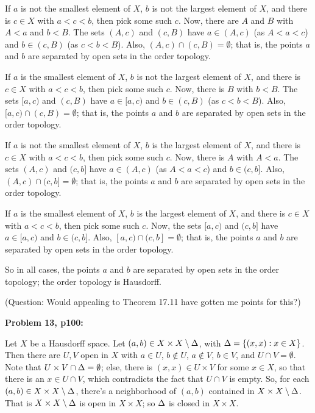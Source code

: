 \documentclass[a4paper,12pt]{article}
\begin{document}
If $a$ is not the smallest element of $X$, $b$ is not the largest element of $X$, and there is $c \in X$ with $a < c < b$, then pick some such $c$. Now, there are $A$ and $B$ with $A< a$ and $b < B$. The sets $(A,c)$ and $(c,B)$ have $a \in (A,c)$ (as $A < a < c$) and $b \in (c,B)$ (as $c<b<B$). Also, $(A,c) \cap (c,B) = \emptyset$; that is, the points $a$ and $b$ are separated by open sets in the order topology. %

If $a$ is the smallest element of $X$, $b$ is not the largest element of $X$, and there is $c \in X$ with $a < c < b$, then pick some such $c$. Now, there is $B$ with $b < B$. The sets $[a,c)$ and $(c,B)$ have $a \in [a,c)$ and $b \in (c,B)$ (as $c<b<B$). Also, $[a,c) \cap (c,B) = \emptyset$; that is, the points $a$ and $b$ are separated by open sets in the order topology. %

If $a$ is not the smallest element of $X$, $b$ is the largest element of $X$, and there is $c \in X$ with $a < c < b$, then pick some such $c$. Now, there is $A$ with $A< a$. The sets $(A,c)$ and $(c,b]$ have $a \in (A,c)$ (as $A < a < c$) and $b \in (c,b]$. Also, $(A,c) \cap (c,b] = \emptyset$; that is, the points $a$ and $b$ are separated by open sets in the order topology. %

If $a$ is the smallest element of $X$, $b$ is the largest element of $X$, and there is $c \in X$ with $a < c < b$, then pick some such $c$. Now, the sets $[a,c)$ and $(c,b]$ have $a \in [a,c)$ and $b \in (c,b]$. Also, $[a,c) \cap (c,b] = \emptyset$; that is, the points $a$ and $b$ are separated by open sets in the order topology. %

So in all cases, the points $a$ and $b$ are separated by open sets in the order topology; the order topology is Hausdorff.

(Question: Would appealing to Theorem 17.11 have gotten me points for this?)

\shunt

{\bf Problem 13, p100:}

Let $X$ be a Hausdorff space. Let $(a,b) \in X \times X \setminus \Delta$, with $\Delta = \{(x,x): x \in X\}$. Then there are $U,V$ open in $X$ with $a \in U$, $b \notin U$, $a \notin V$, $b \in V$, and $U \cap V = \emptyset$. Note that $U \times V \cap \Delta = \emptyset$; else, there is $(x,x) \in U \times V$ for some $x \in X$, so that there is an $x \in U \cap V$, which contradicts the fact that $U \cap V$ is empty. So, for each $(a,b) \in X \times X \setminus \Delta$, there's a neighborhood of $(a,b)$ contained in $X \times X \setminus \Delta$. That is $X \times X \setminus \Delta$ is open in $X \times X$; so $\Delta$ is closed in $X \times X$.
\end{document}
